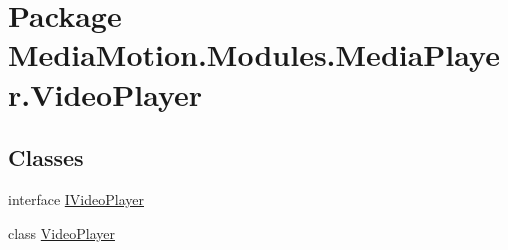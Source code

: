 \hypertarget{namespace_media_motion_1_1_modules_1_1_media_player_1_1_video_player}{\section{Package Media\+Motion.\+Modules.\+Media\+Player.\+Video\+Player}
\label{namespace_media_motion_1_1_modules_1_1_media_player_1_1_video_player}
}
\subsection*{Classes}
\begin{DoxyCompactItemize}
\item 
interface \hyperlink{interface_media_motion_1_1_modules_1_1_media_player_1_1_video_player_1_1_i_video_player}{I\+Video\+Player}
\item 
class \hyperlink{class_media_motion_1_1_modules_1_1_media_player_1_1_video_player_1_1_video_player}{Video\+Player}
\end{DoxyCompactItemize}
